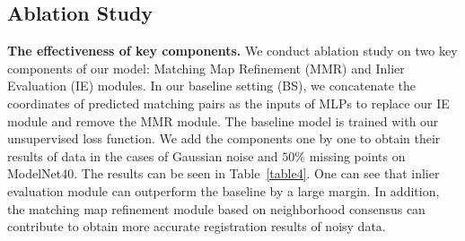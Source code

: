 \documentclass[letterpaper]{article} %
\begin{document}
	\subsection{Ablation Study}\label{ablation}
	\noindent \textbf {The effectiveness of key components.}
	We conduct ablation study on two key components of our model: Matching Map Refinement (MMR) and Inlier Evaluation (IE) modules. In our baseline setting (BS), we concatenate the coordinates of predicted matching pairs as the inputs of MLPs to replace our IE module and remove the MMR module. The baseline model is trained with our unsupervised loss function. We add the components one by one to obtain their results of data in the cases of Gaussian noise and $50\%$ missing points on ModelNet40. The results can be seen in Table~\ref{table4}. One can see that inlier evaluation module can outperform the baseline by a large margin. In addition, the matching map refinement module based on neighborhood consensus can contribute to obtain more accurate registration results of noisy data.

	\begin{table}[t]
		\setlength{\abovecaptionskip}{0pt}
		\setlength{\belowcaptionskip}{0pt}
		\begin{center}
		\end{center}
		\caption{The results of different combination of key components on ModelNet40.}
		\label{table4}
		\vskip -5pt
	\end{table}

	\begin{table}[t]
		\setlength{\abovecaptionskip}{0pt}
		\setlength{\belowcaptionskip}{0pt}
		\begin{center}
		\end{center}
		\caption{The results of different combination of loss functions on 7Scenes.}
		\label{loss}
		\vskip -5pt
	\end{table}
\end{document}
